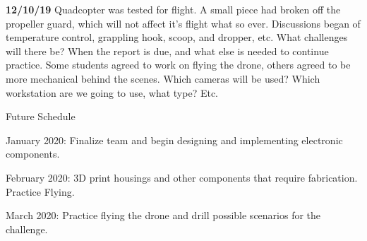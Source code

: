 \textbf{12/10/19}    Quadcopter was tested for flight. A small piece had broken off the propeller guard, which will not affect it's flight what so ever. Discussions began of temperature control, grappling hook, scoop, and dropper, etc. What challenges will there be? When the report is due, and what else is needed to continue practice. Some students agreed to work on flying the drone, others agreed to be more mechanical behind the scenes. Which cameras will be used? Which workstation are we going to use, what type? Etc.

Future Schedule

January 2020: Finalize team and begin designing and implementing electronic components.

February 2020: 3D print housings and other components that require fabrication. Practice Flying.

March 2020: Practice flying the drone and drill possible scenarios for the challenge.


\nocite{*}




%

